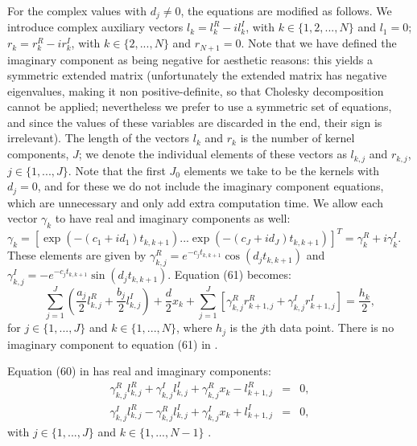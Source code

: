 \documentclass[manuscript, letterpaper]{aastex6}
\begin{document}
For the complex values with $d_j \ne 0$, the equations are modified as follows.  We introduce complex
auxiliary vectors $l_k = l_{k}^R - i l_{k}^I$, with $k \in \{1,2,...,N\}$ and $l_1 = 0$; $r_k =
r_k^R - i r_k^I$, with $k \in \{2,...,N\}$ and $r_{N+1} = 0$.  Note that we have defined the
imaginary component as being negative for aesthetic reasons:  this yields a symmetric extended
matrix (unfortunately the extended matrix has negative eigenvalues, making it non positive-definite,
so that Cholesky decomposition cannot be applied; nevertheless we prefer to use a symmetric
set of equations, and since the values of these variables are discarded in the end, their sign
is irrelevant).  The length of the vectors $l_k$ and $r_k$
is the number of kernel components, $J$;  we denote the individual elements of these vectors
as $l_{k,j}$ and $r_{k,j}$, $j \in \{1,...,J\}$.  Note that the first $J_0$ elements we take
to be the kernels with $d_j=0$, and for these we do not include the imaginary component
equations, which are unnecessary and only add extra computation time.  We allow each vector $\gamma_k$ to have real and imaginary
components as well:  $\gamma_k = \left[\exp{(-(c_1+id_1) t_{k,k+1})} ... \exp{(-(c_J+id_J) t_{k,k+1})}\right]^T
 = \gamma_k^R + i \gamma_k^I.$  These elements are given by $\gamma_{k,j}^R = e^{-c_j t_{k,k+1}}
\cos{(d_j t_{k,k+1})}$ and $\gamma_{k,j}^I = -e^{-c_j t_{k,k+1}}\sin{(d_j t_{k,k+1})}$.
Equation (61) becomes:
\begin{equation} \label{Amb61}
\sum_{j=1}^J \left(\frac{a_j}{2} l_{k,j}^R +\frac{b_j}{2} l_{k,j}^I\right)+ \frac{d}{2} x_k + \sum_{j=1}^J \left[
\gamma_{k,j}^R r_{k+1,j}^R + \gamma_{k,j}^I r_{k+1,j}^I\right] = \frac{h_k}{2},
\end{equation}
for $j \in \{1,...,J\}$ and $k \in \{1,...,N\}$, where $h_j$ is the $j$th data point.  There is no imaginary component to equation (61)
in \citet{Ambikasaran:2015}.

Equation (60) in \citet{Ambikasaran:2015} has real and imaginary components:
\begin{eqnarray} \label{Amb60}
\gamma_{k,j}^R l_{k,j}^R +\gamma_{k,j}^I l_{k,j}^I + \gamma_{k,j}^R x_k - l_{k+1,j}^R &=& 0,\\
\gamma_{k,j}^I l_{k,j}^R -\gamma_{k,j}^R l_{k,j}^I + \gamma_{k,j}^I x_k + l_{k+1,j}^I &=& 0,
\end{eqnarray}
with $j \in \{1,...,J\}$ and $k \in \{1,...,N-1\}$
\citep[note that we have shifted the indices of this equation by one from the indexing using in][]{Ambikasaran:2015}.
\end{document}
